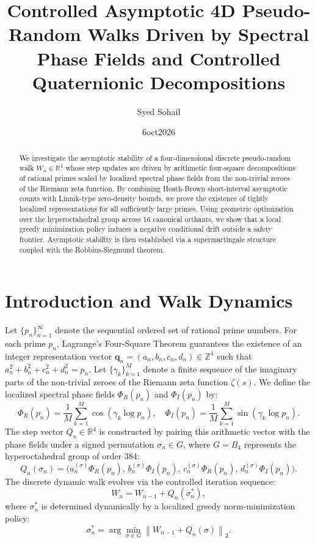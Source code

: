 \documentclass[11pt,a4paper]{article}
\title{Controlled Asymptotic 4D Pseudo-Random Walks Driven by Spectral Phase Fields and Controlled Quaternionic Decompositions}
\author{Syed Sohail}
\date{\26oct2026}
\newcommand{\R}{\mathbb{R}}
\newcommand{\Z}{\mathbb{Z}}
\newcommand{\norm}[1]{\left\lVert#1\right\rVert}
\begin{document}
\maketitle

\begin{abstract}
We investigate the asymptotic stability of a four-dimensional discrete pseudo-random walk $W_n \in \R^4$ whose step updates are driven by arithmetic four-square decompositions of rational primes scaled by localized spectral phase fields from the non-trivial zeroes of the Riemann zeta function. By combining Heath-Brown short-interval asymptotic counts with Linnik-type zero-density bounds, we prove the existence of tightly localized representations for all sufficiently large primes. Using geometric optimization over the hyperoctahedral group across 16 canonical orthants, we show that a local greedy minimization policy induces a negative conditional drift outside a safety frontier. Asymptotic stability is then established via a supermartingale structure coupled with the Robbins-Siegmund theorem.
\end{abstract}

\section{Introduction and Walk Dynamics}
Let $\{p_n\}_{n=1}^{\infty}$ denote the sequential ordered set of rational prime numbers. For each prime $p_n$, Lagrange's Four-Square Theorem guarantees the existence of an integer representation vector $\mathbf{q}_n = (a_n, b_n, c_n, d_n) \in \Z^4$ such that $a_n^2 + b_n^2 + c_n^2 + d_n^2 = p_n$. Let $\{\gamma_k\}_{k=1}^{M}$ denote a finite sequence of the imaginary parts of the non-trivial zeroes of the Riemann zeta function $\zeta(s)$. We define the localized spectral phase fields $\Phi_R(p_n)$ and $\Phi_I(p_n)$ by:
\begin{equation}
    \Phi_R(p_n) = \frac{1}{M}\sum_{k=1}^M \cos(\gamma_k \log p_n), \quad \Phi_I(p_n) = \frac{1}{M}\sum_{k=1}^M \sin(\gamma_k \log p_n).
\end{equation}
The step vector $Q_n \in \R^4$ is constructed by pairing this arithmetic vector with the phase fields under a signed permutation $\sigma_n \in G$, where $G = B_4$ represents the hyperoctahedral group of order 384:
\begin{equation}
    Q_n(\sigma_n) = \Big( a_n^{(\sigma)} \Phi_R(p_n),\, b_n^{(\sigma)} \Phi_I(p_n),\, c_n^{(\sigma)} \Phi_R(p_n),\, d_n^{(\sigma)} \Phi_I(p_n) \Big).
\end{equation}
The discrete dynamic walk evolves via the controlled iteration sequence:
\begin{equation}
    W_n = W_{n-1} + Q_n(\sigma_n^*),
\end{equation}
where $\sigma_n^*$ is determined dynamically by a localized greedy norm-minimization policy:
\begin{equation}
    \sigma_n^* = \arg\min_{\sigma \in G} \norm{W_{n-1} + Q_n(\sigma)}_2.
\end{equation}
\end{document}
